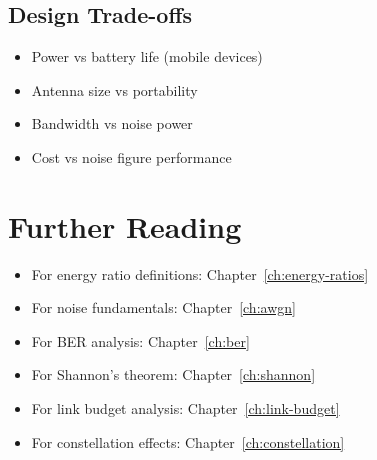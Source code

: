 \subsection*{Design Trade-offs}

\begin{itemize}
\item Power vs battery life (mobile devices)
\item Antenna size vs portability
\item Bandwidth vs noise power
\item Cost vs noise figure performance
\end{itemize}

\section{Further Reading}

\begin{itemize}
\item For energy ratio definitions: Chapter~\ref{ch:energy-ratios}
\item For noise fundamentals: Chapter~\ref{ch:awgn}
\item For BER analysis: Chapter~\ref{ch:ber}
\item For Shannon's theorem: Chapter~\ref{ch:shannon}
\item For link budget analysis: Chapter~\ref{ch:link-budget}
\item For constellation effects: Chapter~\ref{ch:constellation}
\end{itemize}

